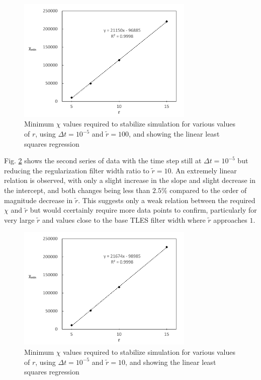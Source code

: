 \begin{figure}[!tb]
\centering
\includegraphics[width=0.75\textwidth]{figures/min_chi_dt5_r100.pdf}
\caption{Minimum $\chi$ values required to stabilize simulation for various values of $r$, using $\Delta t=10^{-5}$ and $\tilde{r}=100$, and showing the linear least squares regression}
\label{fig:min_chi_dt5_r100}
\end{figure}

Fig. \ref{fig:min_chi_dt5_r10} shows the second series of data  with the time step still at $\Delta t=10^{-5}$ but reducing the regularization filter width ratio to $\tilde{r}=10$. An extremely linear relation is observed, with only a slight increase in the slope and slight decrease in the intercept, and both changes being less than $2.5\%$ compared to the order of magnitude decrease in $\tilde{r}$. This suggests only a weak relation between the required $\chi$ and $\tilde{r}$ but would ccertainly require more data points to confirm, particularly for very large $\tilde{r}$ and values close to the base TLES filter width where $\tilde{r}$ approaches $1$.

\begin{figure}[!tb]
\centering
\includegraphics[width=0.75\textwidth]{figures/min_chi_dt5_r10.pdf}
\caption{Minimum $\chi$ values required to stabilize simulation for various values of $r$, using $\Delta t=10^{-5}$ and $\tilde{r}=10$, and showing the linear least squares regression}
\label{fig:min_chi_dt5_r10}
\end{figure}

